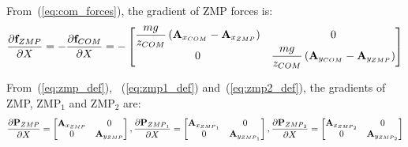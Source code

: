 \documentclass[journal]{IEEEtran}
\begin{document}
From~(\ref{eq:com_forces}), the gradient of ZMP forces is:
\begin{equation}
\dfrac{\partial{\mathbf{f}_{\tiny ZMP}}}{\partial{X}}=-\dfrac{\partial{\mathbf{f}_{\tiny COM}}}{\partial{X}}=-\begin{bmatrix}
\dfrac{mg}{z_{\mbox{\tiny COM}}} \left(\mathbf{A}_{x_{\mbox{\tiny COM}}}- \mathbf{A}_{x_{\mbox{\tiny ZMP}}} \right) & 0\\
0 & \dfrac{mg}{z_{\mbox{\tiny COM}}} \left(\mathbf{A}_{y_{\mbox{\tiny COM}}}- \mathbf{A}_{y_{\mbox{\tiny ZMP}}} \right)
\end{bmatrix}
\end{equation}

From~(\ref{eq:zmp_def}), {}~(\ref{eq:zmp1_def}) and~(\ref{eq:zmp2_def}), the gradients of ZMP, ZMP$_1$ and ZMP$_2$ are:
\begin{equation}
\dfrac{\partial{\mathbf{P}_{\mbox{\tiny ZMP}}}}{\partial{X}}=\begin{bmatrix}
\mathbf{A}_{x_{\mbox{\tiny ZMP}}} & 0\\
0 & \mathbf{A}_{y_{\mbox{\tiny ZMP}}}
\end{bmatrix},
{}
\dfrac{\partial{\mathbf{P}_{\mbox{\tiny ZMP}_1}}}{\partial{X}}=\begin{bmatrix}
\mathbf{A}_{x_{\mbox{\tiny ZMP}_1}} & 0\\
0 & \mathbf{A}_{y_{\mbox{\tiny ZMP}_1}}
\end{bmatrix},
{}
\dfrac{\partial{\mathbf{P}_{\mbox{\tiny ZMP}_2}}}{\partial{X}}=\begin{bmatrix}
\mathbf{A}_{x_{\mbox{\tiny ZMP}_2}} & 0\\
0 & \mathbf{A}_{y_{\mbox{\tiny ZMP}_2}}
\end{bmatrix}
\end{equation}
\end{document}
